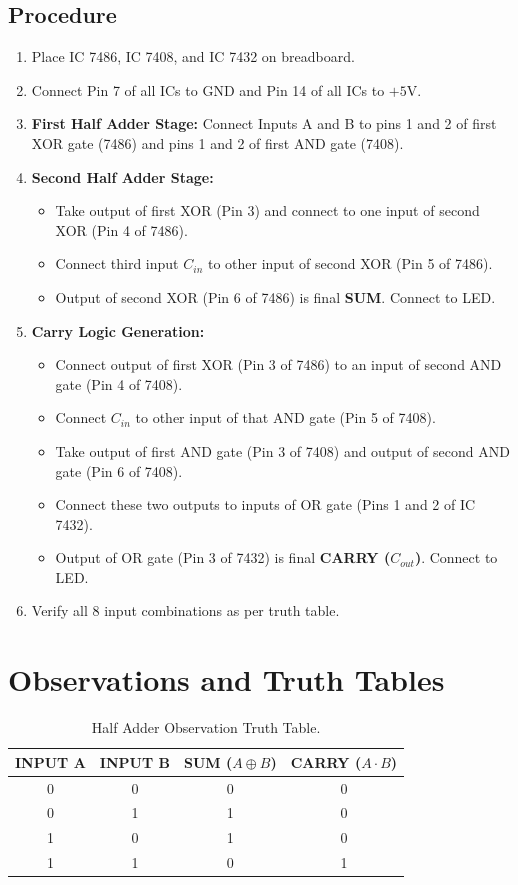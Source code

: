 \subsection{Procedure}
\begin{enumerate}
    \item Place IC 7486, IC 7408, and IC 7432 on breadboard.
    \item Connect Pin 7 of all ICs to GND and Pin 14 of all ICs to $+5\text{V}$.
    \item \textbf{First Half Adder Stage:} Connect Inputs A and B to pins 1 and 2 of first XOR gate (7486) and pins 1 and 2 of first AND gate (7408).
    \item \textbf{Second Half Adder Stage:}
    \begin{itemize}
        \item Take output of first XOR (Pin 3) and connect to one input of second XOR (Pin 4 of 7486).
        \item Connect third input $C_{in}$ to other input of second XOR (Pin 5 of 7486).
        \item Output of second XOR (Pin 6 of 7486) is final \textbf{SUM}. Connect to LED.
    \end{itemize}
    \item \textbf{Carry Logic Generation:}
    \begin{itemize}
        \item Connect output of first XOR (Pin 3 of 7486) to an input of second AND gate (Pin 4 of 7408).
        \item Connect $C_{in}$ to other input of that AND gate (Pin 5 of 7408).
        \item Take output of first AND gate (Pin 3 of 7408) and output of second AND gate (Pin 6 of 7408).
        \item Connect these two outputs to inputs of OR gate (Pins 1 and 2 of IC 7432).
        \item Output of OR gate (Pin 3 of 7432) is final \textbf{CARRY ($C_{out}$)}. Connect to LED.
    \end{itemize}
    \item Verify all 8 input combinations as per truth table.
\end{enumerate}

\section{Observations and Truth Tables}

\begin{table}[htbp]
\centering
\small
\begin{tabularx}{0.75\textwidth}{c c c c}
\toprule
\textbf{INPUT A} & \textbf{INPUT B} & \textbf{SUM ($A \oplus B$)} & \textbf{CARRY ($A \cdot B$)} \\
\midrule
0 & 0 & 0 & 0 \\
0 & 1 & 1 & 0 \\
1 & 0 & 1 & 0 \\
1 & 1 & 0 & 1 \\
\bottomrule
\end{tabularx}
\caption{Half Adder Observation Truth Table.}
\label{tab:half-adder-tt}
\end{table}


